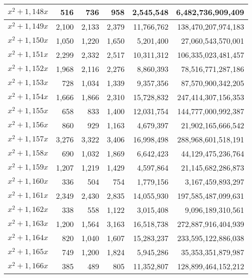 \documentclass[a4paper]{amsproc}
\theoremstyle{plain}
\begin{document}
\begin{longtable}{ | l | r | r | r | r | r | }
$x^2 + 1{,}148x$ & 516 & 736 & 958 & 2{,}545{,}548 & 6{,}482{,}736{,}909{,}409 \\ \hline
$x^2 + 1{,}149x$ & 2{,}100 & 2{,}133 & 2{,}379 & 11{,}766{,}762 & 138{,}470{,}207{,}974{,}183 \\ \hline
$x^2 + 1{,}150x$ & 1{,}050 & 1{,}220 & 1{,}650 & 5{,}201{,}400 & 27{,}060{,}543{,}570{,}001 \\ \hline
$x^2 + 1{,}151x$ & 2{,}299 & 2{,}332 & 2{,}517 & 10{,}311{,}312 & 106{,}335{,}023{,}481{,}457 \\ \hline
$x^2 + 1{,}152x$ & 1{,}968 & 2{,}116 & 2{,}276 & 8{,}860{,}393 & 78{,}516{,}771{,}287{,}186 \\ \hline
$x^2 + 1{,}153x$ & 728 & 1{,}034 & 1{,}339 & 9{,}357{,}356 & 87{,}570{,}900{,}342{,}205 \\ \hline
$x^2 + 1{,}154x$ & 1{,}666 & 1{,}866 & 2{,}310 & 15{,}728{,}832 & 247{,}414{,}307{,}156{,}353 \\ \hline
$x^2 + 1{,}155x$ & 658 & 833 & 1{,}400 & 12{,}031{,}754 & 144{,}777{,}000{,}992{,}387 \\ \hline
$x^2 + 1{,}156x$ & 860 & 929 & 1{,}163 & 4{,}679{,}397 & 21{,}902{,}165{,}666{,}542 \\ \hline
$x^2 + 1{,}157x$ & 3{,}276 & 3{,}322 & 3{,}406 & 16{,}998{,}498 & 288{,}968{,}601{,}518{,}191 \\ \hline
$x^2 + 1{,}158x$ & 690 & 1{,}032 & 1{,}869 & 6{,}642{,}423 & 44{,}129{,}475{,}236{,}764 \\ \hline
$x^2 + 1{,}159x$ & 1{,}207 & 1{,}219 & 1{,}429 & 4{,}597{,}864 & 21{,}145{,}682{,}286{,}873 \\ \hline
$x^2 + 1{,}160x$ & 336 & 504 & 754 & 1{,}779{,}156 & 3{,}167{,}459{,}893{,}297 \\ \hline
$x^2 + 1{,}161x$ & 2{,}349 & 2{,}430 & 2{,}835 & 14{,}055{,}930 & 197{,}585{,}487{,}099{,}631 \\ \hline
$x^2 + 1{,}162x$ & 338 & 558 & 1{,}122 & 3{,}015{,}408 & 9{,}096{,}189{,}310{,}561 \\ \hline
$x^2 + 1{,}163x$ & 1{,}200 & 1{,}564 & 3{,}163 & 16{,}518{,}738 & 272{,}887{,}916{,}404{,}939 \\ \hline
$x^2 + 1{,}164x$ & 820 & 1{,}040 & 1{,}607 & 15{,}283{,}237 & 233{,}595{,}122{,}886{,}038 \\ \hline
$x^2 + 1{,}165x$ & 749 & 1{,}200 & 1{,}824 & 5{,}945{,}286 & 35{,}353{,}351{,}879{,}987 \\ \hline
$x^2 + 1{,}166x$ & 385 & 489 & 805 & 11{,}352{,}807 & 128{,}899{,}464{,}152{,}212 \\ \hline

\end{longtable}
\end{document}
